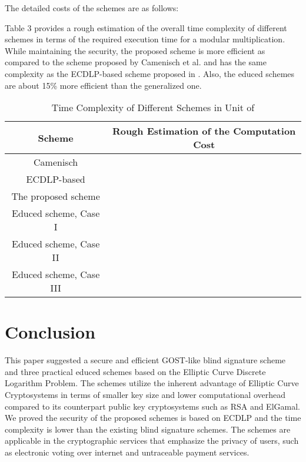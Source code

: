 \documentclass[journal,onecolumn,draftcls]{IEEEtran}
\begin{document}
The detailed costs of the schemes are as follows:


Table 3 provides a rough estimation of the overall time complexity of different schemes in terms of the required execution time for a modular multiplication. While maintaining the security, the proposed scheme is more efficient as compared to the scheme proposed by Camenisch et al. \cite{Camenisch} and has the same complexity as the ECDLP-based scheme proposed in \cite{Nikooghadam}. Also, the educed schemes are about 15\% more efficient than the generalized one.

\begin{table}[!t]
\caption{Time Complexity of Different Schemes in Unit of }
\label{tb:complexity}
\centering
\begin{tabular}{|c|c|}
\hline
\bfseries \textbf{Scheme} & \textbf{Rough Estimation of the Computation Cost}\\
\hline
Camenisch \cite{Camenisch} 	& \\
\hline
ECDLP-based \cite{Nikooghadam} &  \\
\hline
The proposed scheme &  \\
\hline
Educed scheme, Case I &  \\
\hline
Educed scheme, Case II &  \\
\hline
Educed scheme, Case III &  \\
\hline
\end{tabular}
\end{table}


\section{Conclusion}
This paper suggested a secure and efficient GOST-like blind signature scheme and three practical educed schemes based on the Elliptic Curve Discrete Logarithm Problem. The schemes utilize the inherent advantage of Elliptic Curve Cryptosystems in terms of smaller key size and lower computational overhead compared to its counterpart public key cryptosystems such as RSA and ElGamal. We proved the security of the proposed schemes is based on ECDLP and the time complexity is lower than the existing blind signature schemes. The schemes are applicable in the cryptographic services that emphasize the privacy of users, such as electronic voting over internet and untraceable payment services.
\end{document}
